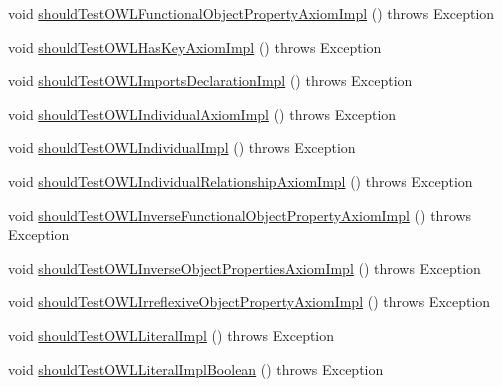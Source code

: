 \begin{DoxyCompactItemize}
\item 
void \hyperlink{classorg_1_1semanticweb_1_1owlapi_1_1contract_1_1_contract_owlapi__2_test_a9a1d06a94af81c215800751d83844d87}{should\-Test\-O\-W\-L\-Functional\-Object\-Property\-Axiom\-Impl} ()  throws Exception 
\item 
void \hyperlink{classorg_1_1semanticweb_1_1owlapi_1_1contract_1_1_contract_owlapi__2_test_a9134d98c3f108a39231d20f8bb5cca0f}{should\-Test\-O\-W\-L\-Has\-Key\-Axiom\-Impl} ()  throws Exception 
\item 
void \hyperlink{classorg_1_1semanticweb_1_1owlapi_1_1contract_1_1_contract_owlapi__2_test_af8e675b3862ad7f06d25c8cd0c9f7441}{should\-Test\-O\-W\-L\-Imports\-Declaration\-Impl} ()  throws Exception 
\item 
void \hyperlink{classorg_1_1semanticweb_1_1owlapi_1_1contract_1_1_contract_owlapi__2_test_a4741a8e0e0bff729285d43e271ffd2d2}{should\-Test\-O\-W\-L\-Individual\-Axiom\-Impl} ()  throws Exception 
\item 
void \hyperlink{classorg_1_1semanticweb_1_1owlapi_1_1contract_1_1_contract_owlapi__2_test_aa72d6878d1c2b17098a50249b8d01005}{should\-Test\-O\-W\-L\-Individual\-Impl} ()  throws Exception 
\item 
void \hyperlink{classorg_1_1semanticweb_1_1owlapi_1_1contract_1_1_contract_owlapi__2_test_a7ceda61f291de8873f58139f0c16d100}{should\-Test\-O\-W\-L\-Individual\-Relationship\-Axiom\-Impl} ()  throws Exception 
\item 
void \hyperlink{classorg_1_1semanticweb_1_1owlapi_1_1contract_1_1_contract_owlapi__2_test_a7e25d3833a207dbd46c26d53f35ef975}{should\-Test\-O\-W\-L\-Inverse\-Functional\-Object\-Property\-Axiom\-Impl} ()  throws Exception 
\item 
void \hyperlink{classorg_1_1semanticweb_1_1owlapi_1_1contract_1_1_contract_owlapi__2_test_a979e822a1457405c1741d9414db98936}{should\-Test\-O\-W\-L\-Inverse\-Object\-Properties\-Axiom\-Impl} ()  throws Exception 
\item 
void \hyperlink{classorg_1_1semanticweb_1_1owlapi_1_1contract_1_1_contract_owlapi__2_test_af8a50c9630011862f79accc1a272d428}{should\-Test\-O\-W\-L\-Irreflexive\-Object\-Property\-Axiom\-Impl} ()  throws Exception 
\item 
void \hyperlink{classorg_1_1semanticweb_1_1owlapi_1_1contract_1_1_contract_owlapi__2_test_aa7bd1590c7b72d9e28648d03051e6b2e}{should\-Test\-O\-W\-L\-Literal\-Impl} ()  throws Exception 
\item 
void \hyperlink{classorg_1_1semanticweb_1_1owlapi_1_1contract_1_1_contract_owlapi__2_test_a00cefd669ddd26996790d624185c8c3b}{should\-Test\-O\-W\-L\-Literal\-Impl\-Boolean} ()  throws Exception 

\end{DoxyCompactItemize}
